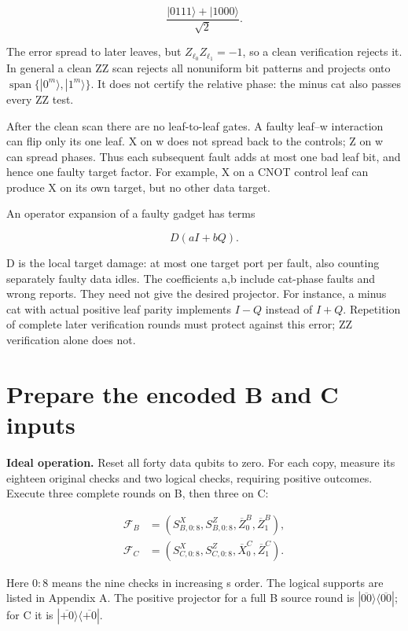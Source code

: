 \documentclass[11pt]{article}
\begin{document}
\[
\frac{|0111\rangle+|1000\rangle}{\sqrt2}.
\]

The error spread to later leaves, but \(Z_{\ell_0}Z_{\ell_1}=-1\), so a clean verification rejects it. In general a clean ZZ scan rejects all nonuniform bit patterns and projects onto \(\operatorname{span}\{|0^m\rangle,|1^m\rangle\}\). It does not certify the relative phase: the minus cat also passes every ZZ test.

After the clean scan there are no leaf-to-leaf gates. A faulty leaf--w interaction can flip only its one leaf. X on w does not spread back to the controls; Z on w can spread phases. Thus each subsequent fault adds at most one bad leaf bit, and hence one faulty target factor. For example, X on a CNOT control leaf can produce X on its own target, but no other data target.

An operator expansion of a faulty gadget has terms

\[
D(aI+bQ).
\]

D is the local target damage: at most one target port per fault, also counting separately faulty data idles. The coefficients a,b include cat-phase faults and wrong reports. They need not give the desired projector. For instance, a minus cat with actual positive leaf parity implements \(I-Q\) instead of \(I+Q\). Repetition of complete later verification rounds must protect against this error; ZZ verification alone does not.

\section{Prepare the encoded B and C inputs}
\textbf{Ideal operation.} Reset all forty data qubits to zero. For each copy, measure its eighteen original checks and two logical checks, requiring positive outcomes. Execute three complete rounds on B, then three on C:

\[
\begin{aligned}
\mathcal F_B&=(S^X_{B,0:8},S^Z_{B,0:8},\overline Z^B_0,\overline Z^B_1),\\
\mathcal F_C&=(S^X_{C,0:8},S^Z_{C,0:8},\overline X^C_0,\overline Z^C_1).
\end{aligned}
\]

Here \(0{:}8\) means the nine checks in increasing s order. The logical supports are listed in Appendix A. The positive projector for a full B source round is \(|\overline{00}\rangle\langle\overline{00}|\); for C it is \(|\overline{+0}\rangle\langle\overline{+0}|\).
\end{document}
